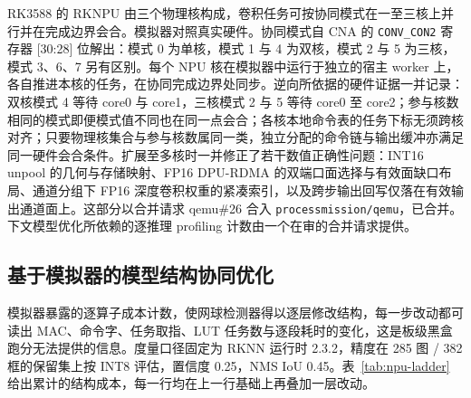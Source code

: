 RK3588 的 RKNPU 由三个物理核构成，卷积任务可按协同模式在一至三核上并行并在完成边界会合。模拟器对照真实硬件。协同模式自 CNA 的 \texttt{CONV\_CON2} 寄存器 [30:28] 位解出：模式 0 为单核，模式 1 与 4 为双核，模式 2 与 5 为三核，模式 3、6、7 另有区别。每个 NPU 核在模拟器中运行于独立的宿主 worker 上，各自推进本核的任务，在协同完成边界处同步。逆向所依据的硬件证据一并记录：双核模式 4 等待 core0 与 core1，三核模式 2 与 5 等待 core0 至 core2；参与核数相同的模式即便模式值不同也在同一点会合；各核本地命令表的任务下标无须跨核对齐；只要物理核集合与参与核数属同一类，独立分配的命令链与输出缓冲亦满足同一硬件会合条件。扩展至多核时一并修正了若干数值正确性问题：INT16 unpool 的几何与存储映射、FP16 DPU-RDMA 的双端口面选择与有效面缺口布局、通道分组下 FP16 深度卷积权重的紧凑索引，以及跨步输出回写仅落在有效输出通道面上。这部分以合并请求 qemu\#26 合入 \texttt{processmission/qemu}，已合并。下文模型优化所依赖的逐推理 profiling 计数由一个在审的合并请求提供。

\subsection{基于模拟器的模型结构协同优化}

模拟器暴露的逐算子成本计数，使网球检测器得以逐层修改结构，每一步改动都可读出 MAC、命令字、任务取指、LUT 任务数与逐段耗时的变化，这是板级黑盒跑分无法提供的信息。度量口径固定为 RKNN 运行时 2.3.2，精度在 285 图 / 382 框的保留集上按 INT8 评估，置信度 0.25，NMS IoU 0.45。表~\ref{tab:npu-ladder} 给出累计的结构成本，每一行均在上一行基础上再叠加一层改动。

\begin{table}[H]\centering\small
{}
\caption{模拟器实测的累计结构成本，逐步压缩 MAC、命令字与逻辑输出}
\label{tab:npu-ladder}
\end{table}

